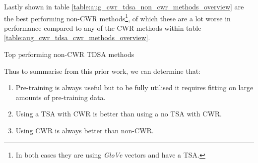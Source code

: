 Lastly shown in table \ref{table:aug_cwr_tdsa_non_cwr_methods_overview} are the best performing non-CWR methods\footnote{In both cases they are using \textit{GloVe} vectors and have a TSA.}, of which these are a lot worse in performance compared to any of the CWR methods within table \ref{table:aug_cwr_tdsa_cwr_methods_overview}.

\afterpage{%
    \thispagestyle{document}
    \begin{landscape}%
            \centering
            
    \end{landscape}
    \clearpage%
}

\begin{table}[!h]
    \centering
    
    \caption{Top performing non-CWR TDSA methods}
    \label{table:aug_cwr_tdsa_non_cwr_methods_overview}
\end{table}

Thus to summarise from this prior work, we can determine that:
\begin{enumerate}
    \item Pre-training is always useful but to be fully utilised it requires fitting on large amounts of pre-training data.
    \item Using a TSA with CWR is better than using a no TSA with CWR.
    \item Using CWR is always better than non-CWR.
\end{enumerate}



